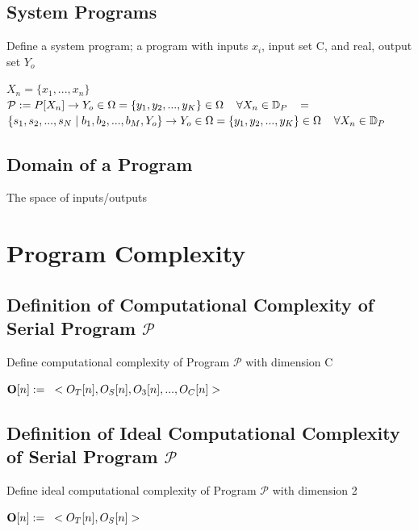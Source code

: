 \documentclass[11pt]{article}
\begin{document}
\subsection{System Programs}
Define a system program; a program with inputs $x_i$, input set C, and real, output set $Y_o$
\begin{center}
$
X_n = \{x_1,...,x_n\}
$
\\ \vspace{2mm}
$\mathcal{P} := P\lbrack X_n \rbrack \rightarrow Y_o \in \Omega = \{y_1,y_2,...,y_K\} \in \Omega \hspace{4mm} \forall X_n \in \mathbb{D}_P \hspace{3mm} =$
\\ \vspace{2mm}
$
\{ s_1,s_2,...,s_{N}\hspace{1mm}|\hspace{1mm} b_1, b_2,...,b_M,Y_o\} \rightarrow Y_o \in \Omega = \{y_1,y_2,...,y_K\} \in \Omega \hspace{4mm} \forall X_n \in \mathbb{D}_P
$
\end{center}


\subsection{Domain of a Program}
The space of inputs/outputs




\section{Program Complexity}

\subsection{Definition of Computational Complexity of Serial Program $\mathcal{P}$}
Define computational complexity of Program $\mathcal{P}$ with dimension C
\begin{center}
$
\bold{O}[n] := \hspace{3mm} < O_T [n], O_S [n], O_3[n],..., O_C[n]>
$
\end{center}



\subsection{Definition of Ideal Computational Complexity of Serial Program $\mathcal{P}$}
Define ideal computational complexity of Program $\mathcal{P}$ with dimension 2
\begin{center}
$
\bold{O}[n] := \hspace{3mm} < O_T [n], O_S [n] >
$
\end{center}
\end{document}
